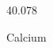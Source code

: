 \documentclass[12pt]{article}
\begin{document}
\hfill{}
\vfill
\begin{center}
  {\fontsize{50}{60}
  }

  \vspace{1em}

  40.078

Calcium
\end{center}
\vfill
\end{document}
